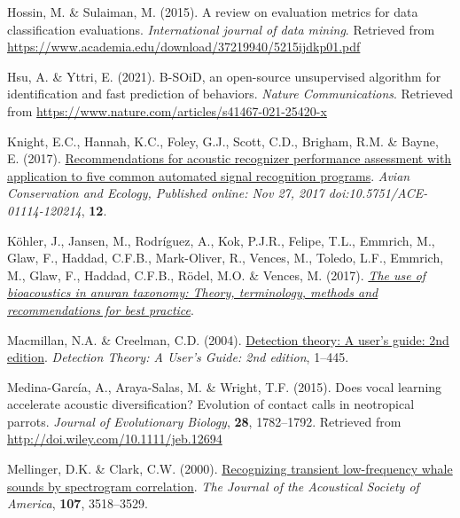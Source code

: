 \documentclass[
]{article}
\newlength{\cslhangindent}
\newlength{\cslentryspacingunit} %
\newenvironment{CSLReferences}[2] %
 {%
  \setlength{\parindent}{0pt}
  \ifodd #1
  \let\oldpar\par
  \def\par{\hangindent=\cslhangindent\oldpar}
  \fi
  \setlength{\parskip}{#2\cslentryspacingunit}
 }%
 {}
\begin{document}
\begin{CSLReferences}{1}{0}
\leavevmode{}%
Hossin, M. \& Sulaiman, M. (2015). A review on evaluation metrics for
data classification evaluations. \emph{International journal of data
mining}. Retrieved from
\url{https://www.academia.edu/download/37219940/5215ijdkp01.pdf}

\leavevmode{}%
Hsu, A. \& Yttri, E. (2021). B-SOiD, an open-source unsupervised
algorithm for identification and fast prediction of behaviors.
\emph{Nature Communications}. Retrieved from
\url{https://www.nature.com/articles/s41467-021-25420-x}

\leavevmode{}%
Knight, E.C., Hannah, K.C., Foley, G.J., Scott, C.D., Brigham, R.M. \&
Bayne, E. (2017).
\href{https://doi.org/10.5751/ACE-01114-120214}{Recommendations for
acoustic recognizer performance assessment with application to five
common automated signal recognition programs}. \emph{Avian Conservation
and Ecology, Published online: Nov 27, 2017 \textbar{}
doi:10.5751/ACE-01114-120214}, \textbf{12}.

\leavevmode{}%
Köhler, J., Jansen, M., Rodríguez, A., Kok, P.J.R., Felipe, T.L.,
Emmrich, M., Glaw, F., Haddad, C.F.B., Mark-Oliver, R., Vences, M.,
Toledo, L.F., Emmrich, M., Glaw, F., Haddad, C.F.B., Rödel, M.O. \&
Vences, M. (2017).
\emph{\href{https://doi.org/10.11646/zootaxa.4251.1.1}{The use of
bioacoustics in anuran taxonomy: Theory, terminology, methods and
recommendations for best practice}}.

\leavevmode{}%
Macmillan, N.A. \& Creelman, C.D. (2004).
\href{https://doi.org/10.4324/9781410611147/DETECTION-THEORY-NEIL-MACMILLAN-DOUGLAS-CREELMAN}{Detection
theory: A user's guide: 2nd edition}. \emph{Detection Theory: A User's
Guide: 2nd edition}, 1--445.

\leavevmode{}%
Medina-García, A., Araya-Salas, M. \& Wright, T.F. (2015). Does vocal
learning accelerate acoustic diversification? Evolution of contact calls
in neotropical parrots. \emph{Journal of Evolutionary Biology},
\textbf{28}, 1782--1792. Retrieved from
\url{http://doi.wiley.com/10.1111/jeb.12694}

\leavevmode{}%
Mellinger, D.K. \& Clark, C.W. (2000).
\href{https://doi.org/10.1121/1.429434}{Recognizing transient
low-frequency whale sounds by spectrogram correlation}. \emph{The
Journal of the Acoustical Society of America}, \textbf{107}, 3518--3529.


\end{CSLReferences}
\end{document}
